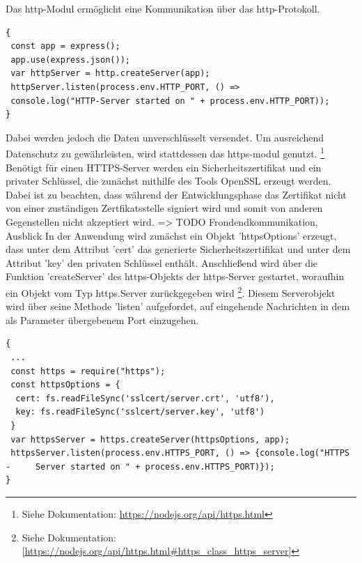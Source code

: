 Das http-Modul ermöglicht eine Kommunikation über das http-Protokoll. 
\begin{lstlisting}[caption=Einfache Verbindung, label=lst:nodejs_easyconnection]
{
 const app = express();
 app.use(express.json()); 
 var httpServer = http.createServer(app);
 httpServer.listen(process.env.HTTP_PORT, () => 
 console.log("HTTP-Server started on " + process.env.HTTP_PORT));
}
\end{lstlisting}

\noindent
Dabei werden jedoch die Daten unverschlüsselt versendet. Um ausreichend Datenschutz zu gewährleisten, wird stattdessen das https-modul genutzt. \footnote{Siehe Dokumentation: \url{https://nodejs.org/api/https.html}}
\newline
Benötigt für einen HTTPS-Server werden ein Sicherheitszertifikat und ein privater Schlüssel, die zunächst mithilfe des Tools OpenSSL erzeugt werden.  
Dabei ist zu beachten, dass während der Entwicklungsphase das Zertifikat nicht von einer zuständigen Zertfikatsstelle signiert wird und somit von anderen Gegenstellen nicht akzeptiert wird. => TODO Frondendkommunikation, Ausblick
\newline
In der Anwendung wird zunächst ein Objekt 'httpsOptions' erzeugt, dass unter dem Attribut 'cert' das generierte Sicherheitszertifikat und unter dem Attribut 'key' den privaten Schlüssel enthält. Anschließend wird über die Funktion 'createServer' des https-Objekts der https-Server gestartet, woraufhin ein Objekt vom Typ https.Server zurückgegeben wird \footnote{Siehe Dokumentation:  \url{[https://nodejs.org/api/https.html\#https_class_https_server]}}. 
Diesem Serverobjekt wird über seine Methode 'listen' aufgefordet, auf eingehende Nachrichten in dem als Parameter übergebenem Port einzugehen.

\begin{lstlisting}[caption=Gesicherte Verbindung, label=lst:nodejs_safeconnection]
{
 ...
 const https = require("https");
 const httpsOptions = {
  cert: fs.readFileSync('sslcert/server.crt', 'utf8'),
  key: fs.readFileSync('sslcert/server.key', 'utf8')
 }
 var httpsServer = https.createServer(httpsOptions, app);
 httpsServer.listen(process.env.HTTPS_PORT, () => {console.log("HTTPS - 	Server started on " + process.env.HTTPS_PORT)});
}
\end{lstlisting}


